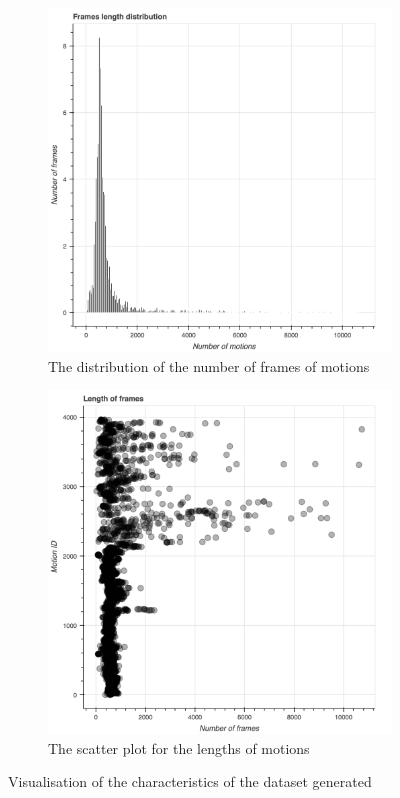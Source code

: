 			\begin{figure}
				\centering
				\begin{subfigure}[b]{.65\textwidth}
					\centering
				\includegraphics[width=\textwidth]{img/num-frames-ditro.png}
				\caption{The distribution of the number of frames of motions}
				\label{fig:num_frames_distro}
			\end{subfigure}
			\hfill
			\begin{subfigure}[b]{0.65\textwidth}
				\centering
				\includegraphics[width=\textwidth]{img/scatter-num-frames.png}
				\caption{The scatter plot for the lengths of motions}
				\label{fig:scatterplot-num-frames}
			\end{subfigure}
			\caption{Visualisation of the characteristics of the dataset generated}
			\end{figure}
